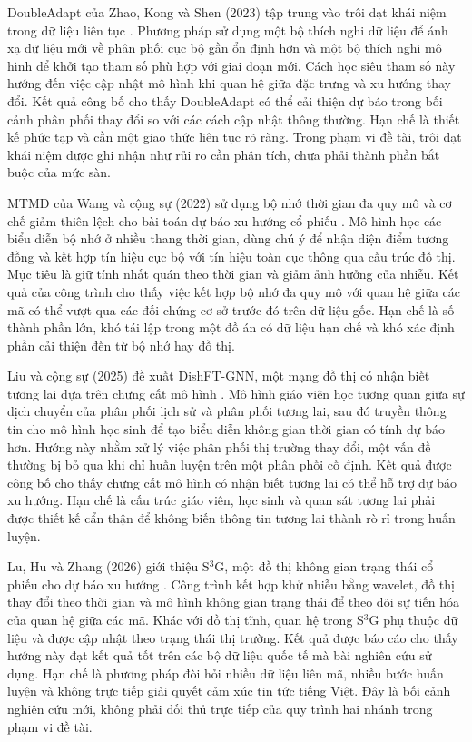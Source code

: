 DoubleAdapt của Zhao, Kong và Shen (2023) tập trung vào trôi dạt khái niệm trong dữ liệu
liên tục \cite{Zhao2023_230609862v3}. Phương pháp sử dụng một bộ thích nghi dữ liệu
để ánh xạ dữ liệu mới về phân phối cục bộ gần ổn định hơn và một bộ thích nghi mô hình
để khởi tạo tham số phù hợp với giai đoạn mới. Cách học siêu tham số này hướng đến
việc cập nhật mô hình khi quan hệ giữa đặc trưng và xu hướng thay đổi. Kết quả công
bố cho thấy DoubleAdapt có thể cải thiện dự báo trong bối cảnh phân phối thay đổi so
với các cách cập nhật thông thường. Hạn chế là thiết kế phức tạp và cần một giao thức
liên tục rõ ràng. Trong phạm vi đề tài, trôi dạt khái niệm được ghi nhận như rủi ro cần
phân tích, chưa phải thành phần bắt buộc của mức sàn.

MTMD của Wang và cộng sự (2022) sử dụng bộ nhớ thời gian đa quy mô và cơ chế giảm
thiên lệch cho bài toán dự báo xu hướng cổ phiếu \cite{Wang2022_221208656v2}. Mô hình học các
biểu diễn bộ nhớ ở nhiều thang thời gian, dùng chú ý để nhận diện điểm tương đồng
và kết hợp tín hiệu cục bộ với tín hiệu toàn cục thông qua cấu trúc đồ thị. Mục tiêu
là giữ tính nhất quán theo thời gian và giảm ảnh hưởng của nhiễu. Kết quả của công
trình cho thấy việc kết hợp bộ nhớ đa quy mô với quan hệ giữa các mã có thể vượt qua
các đối chứng cơ sở trước đó trên dữ liệu gốc. Hạn chế là số thành phần lớn, khó tái lập trong
một đồ án có dữ liệu hạn chế và khó xác định phần cải thiện đến từ bộ nhớ hay đồ thị.

Liu và cộng sự (2025) đề xuất DishFT-GNN, một mạng đồ thị có nhận biết tương lai dựa trên chưng cất mô hình
\cite{Liu2025_250210776v1}. Mô hình giáo viên học tương quan giữa sự dịch chuyển của
phân phối lịch sử và phân phối tương lai, sau đó truyền thông tin cho mô hình học sinh
để tạo biểu diễn không gian thời gian có tính dự báo hơn. Hướng này nhằm xử lý việc
phân phối thị trường thay đổi, một vấn đề thường bị bỏ qua khi chỉ huấn luyện trên một
phân phối cố định. Kết quả được công bố cho thấy chưng cất mô hình có nhận biết tương lai có thể hỗ
trợ dự báo xu hướng. Hạn chế là cấu trúc giáo viên, học sinh và quan sát tương lai phải
được thiết kế cẩn thận để không biến thông tin tương lai thành rò rỉ trong huấn luyện.

Lu, Hu và Zhang (2026) giới thiệu S$^{3}$G, một đồ thị không gian trạng thái cổ phiếu cho dự báo xu
hướng \cite{Lu2026_260324236v1}. Công trình kết hợp khử nhiễu bằng wavelet, đồ thị
thay đổi theo thời gian và mô hình không gian trạng thái để theo dõi sự tiến hóa của quan hệ
giữa các mã. Khác với đồ thị tĩnh, quan hệ trong S$^{3}$G phụ thuộc dữ liệu và được
cập nhật theo trạng thái thị trường. Kết quả được báo cáo cho thấy hướng này đạt kết
quả tốt trên các bộ dữ liệu quốc tế mà bài nghiên cứu sử dụng. Hạn chế là phương pháp
đòi hỏi nhiều dữ liệu liên mã, nhiều bước huấn luyện và không trực tiếp giải quyết
cảm xúc tin tức tiếng Việt. Đây là bối cảnh nghiên cứu mới, không phải đối thủ trực
tiếp của quy trình hai nhánh trong phạm vi đề tài.

